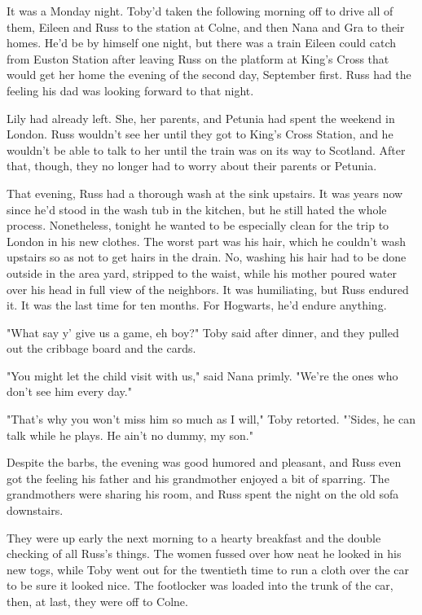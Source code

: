 It was a Monday night. Toby'd taken the following morning off to drive all of them, Eileen and Russ to the station at Colne, and then Nana and Gra to their homes. He'd be by himself one night, but there was a train Eileen could catch from Euston Station after leaving Russ on the platform at King's Cross that would get her home the evening of the second day, September first. Russ had the feeling his dad was looking forward to that night.

Lily had already left. She, her parents, and Petunia had spent the weekend in London. Russ wouldn't see her until they got to King's Cross Station, and he wouldn't be able to talk to her until the train was on its way to Scotland. After that, though, they no longer had to worry about their parents or Petunia.

That evening, Russ had a thorough wash at the sink upstairs. It was years now since he'd stood in the wash tub in the kitchen, but he still hated the whole process. Nonetheless, tonight he wanted to be especially clean for the trip to London in his new clothes. The worst part was his hair, which he couldn't wash upstairs so as not to get hairs in the drain. No, washing his hair had to be done outside in the area yard, stripped to the waist, while his mother poured water over his head in full view of the neighbors. It was humiliating, but Russ endured it. It was the last time for ten months. For Hogwarts, he'd endure anything.

"What say y' give us a game, eh boy?" Toby said after dinner, and they pulled out the cribbage board and the cards.

"You might let the child visit with us," said Nana primly. "We're the ones who don't see him every day."

"That's why you won't miss him so much as I will," Toby retorted. "'Sides, he can talk while he plays. He ain't no dummy, my son."

Despite the barbs, the evening was good humored and pleasant, and Russ even got the feeling his father and his grandmother enjoyed a bit of sparring. The grandmothers were sharing his room, and Russ spent the night on the old sofa downstairs.

They were up early the next morning to a hearty breakfast and the double checking of all Russ's things. The women fussed over how neat he looked in his new togs, while Toby went out for the twentieth time to run a cloth over the car to be sure it looked nice. The footlocker was loaded into the trunk of the car, then, at last, they were off to Colne.

